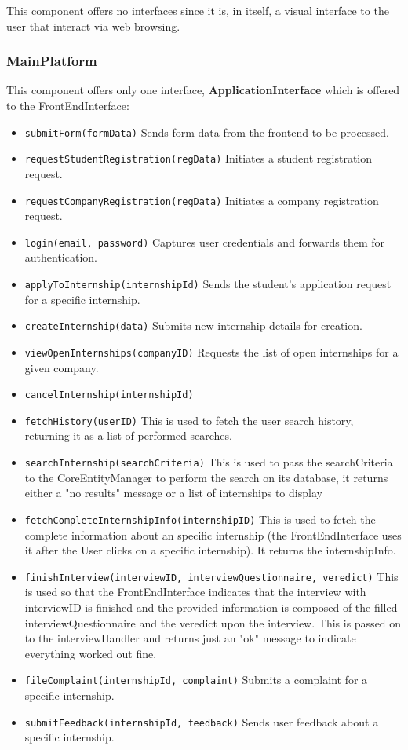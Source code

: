 This component offers no interfaces since it is, in itself, a visual interface to the user that interact via web browsing.




\subsubsection{MainPlatform} 

This component offers only one interface, \textbf{ApplicationInterface}
which is offered to the FrontEndInterface:
\begin{itemize}
    \item \texttt{submitForm(formData)} 
    Sends form data from the frontend to be processed.
    \item \texttt{requestStudentRegistration(regData)} Initiates a student registration request.
    \item \texttt{requestCompanyRegistration(regData)} Initiates a company registration request.
    \item \texttt{login(email, password)} Captures user credentials and forwards them for authentication.
    \item \texttt{applyToInternship(internshipId)} Sends the student’s application request for a specific internship.
    \item \texttt{createInternship(data)} Submits new internship details for creation.
    \item \texttt{viewOpenInternships(companyID)} Requests the list of open internships for a given company.
    \item \texttt{cancelInternship(internshipId)}
    \item \texttt{fetchHistory(userID)}
    This is used to fetch the user search history, returning it as a list of performed searches.
    \item \texttt{searchInternship(searchCriteria)}
    This is used to pass the searchCriteria to the CoreEntityManager to perform the search on its database, it returns either a "no results" message or a list of internships to display
    \item \texttt{fetchCompleteInternshipInfo(internshipID)}
    This is used to fetch the complete information about an specific internship (the FrontEndInterface uses it after the User clicks on a specific internship). It returns the internshipInfo.
    \item \texttt{finishInterview(interviewID, interviewQuestionnaire, veredict)}
    This is used so that the FrontEndInterface indicates that the interview with interviewID is finished and the provided information is composed of the filled interviewQuestionnaire and the veredict upon the interview. This is passed on to the interviewHandler and returns just an "ok" message to indicate everything worked out fine.
    \item \texttt{fileComplaint(internshipId, complaint)} Submits a complaint for a specific internship.
    \item \texttt{submitFeedback(internshipId, feedback)} Sends user feedback about a specific internship.
\end{itemize}



